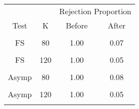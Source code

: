 \begin{table}[!h]
\centering
\begin{tabular}{cccc}
\toprule
\multicolumn{1}{c}{ } & \multicolumn{1}{c}{ } & \multicolumn{2}{c}{Rejection Proportion} \\
\cmidrule(l{3pt}r{3pt}){3-4}
Test & K & Before & After\\
\midrule
\cellcolor{gray!6}{FS} & \cellcolor{gray!6}{60} & \cellcolor{gray!6}{1.00} & \cellcolor{gray!6}{0.07}\\
FS & 80 & 1.00 & 0.07\\
\cellcolor{gray!6}{FS} & \cellcolor{gray!6}{100} & \cellcolor{gray!6}{1.00} & \cellcolor{gray!6}{0.05}\\
FS & 120 & 1.00 & 0.05\\
\cellcolor{gray!6}{Asymp} & \cellcolor{gray!6}{60} & \cellcolor{gray!6}{1.00} & \cellcolor{gray!6}{0.08}\\
\addlinespace
Asymp & 80 & 1.00 & 0.08\\
\cellcolor{gray!6}{Asymp} & \cellcolor{gray!6}{100} & \cellcolor{gray!6}{1.00} & \cellcolor{gray!6}{0.05}\\
Asymp & 120 & 1.00 & 0.05\\
\cellcolor{gray!6}{ECE} & \cellcolor{gray!6}{} & \cellcolor{gray!6}{0.31} & \cellcolor{gray!6}{0.12}\\
\bottomrule
\end{tabular}
\end{table}
